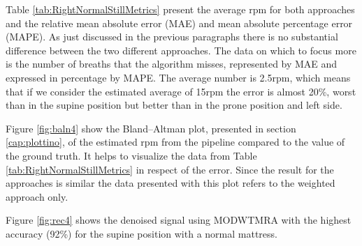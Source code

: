 \vspace{1cm}
%


\vspace{0.5cm}

Table \ref{tab:RightNormalStillMetrics} present the average rpm for both approaches  
and the relative mean absolute error (MAE) and mean absolute percentage error (MAPE). As just discussed in the previous paragraphs there is no substantial difference between the two different approaches. The data on which to focus more is the number of breaths that the algorithm misses, represented by MAE and expressed in percentage by MAPE. The average number is 2.5rpm, which means that if we consider the estimated average of 15rpm the error is almost 20\%, worst than in the supine position but better than in the prone position and left side.

\vspace{1cm}

\vspace{0.5cm}

Figure \ref{fig:baln4} show the Bland–Altman plot, presented in section \ref{cap:plottino}, of the estimated rpm from the pipeline compared to the value of the ground truth. It helps to visualize the data from Table \ref{tab:RightNormalStillMetrics} in respect of the error. Since the result for the approaches is similar the data presented with this plot refers to the weighted approach only.

Figure \ref{fig:rec4} shows the denoised signal using MODWTMRA with the highest accuracy (92\%) for the supine position with a normal mattress.

